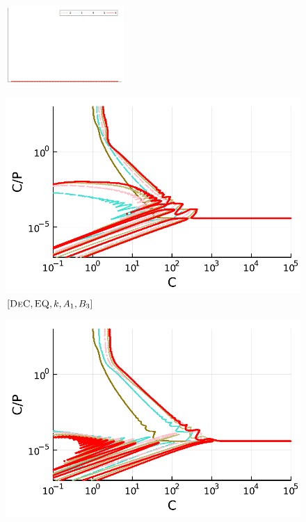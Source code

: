 \begin{figure}
	\centering
	\includegraphics[width=0.4\textwidth,trim={230 340 30 22}, clip]{pdf/pdepics/legends/colors_a-d_new_horiz_2-6_no_order.pdf}\\
	\begin{minipage}[t]{0.32\textwidth}
		\centering
		\includegraphics[width=\textwidth]{pdf/pdepics/disp/IMEXDeC_equispaced_disp_TMM_2-6_newE.pdf}
		\small$[\textsc{DeC}, \textsc{EQ},k,A_1,B_3]$\par
	\end{minipage}
	\begin{minipage}[t]{0.32\textwidth}
		\centering
		\includegraphics[width=\textwidth]{pdf/pdepics/disp/IMEXDeC_subtimesteps_equispaced_disp_TMM_2-6_newE.pdf}

\end{minipage}
\end{figure}
